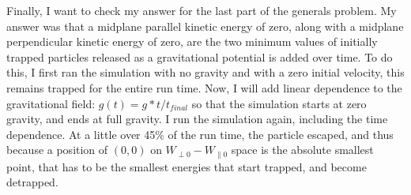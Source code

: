 \documentclass[12pt]{article}
\begin{document}
Finally, I want to check my answer for the last part of the generals problem. My answer was that a midplane parallel kinetic energy of zero, along with a midplane perpendicular kinetic energy of zero, are the two minimum values of initially trapped particles released as a gravitational potential is added over time. To do this, I first ran the simulation with no gravity and with a zero initial velocity, this remains trapped for the entire run time. Now, I will add linear dependence to the gravitational field: $g(t)=g*t/t_{final}$ so that the simulation starts at zero gravity, and ends at full gravity. I run the simulation again, including the time dependence. At a little over 45\% of the run time, the particle escaped, and thus because a position of $(0,0)$ on $W_{\perp0}-W_{\parallel0}$ space is the absolute smallest point, that has to be the smallest energies that start trapped, and become detrapped. 
\end{document}
